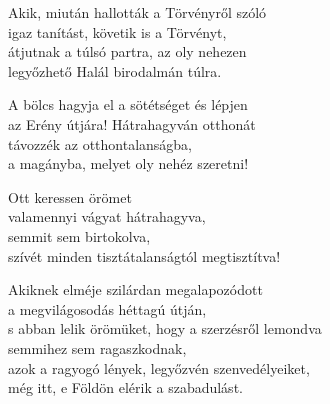 \begin{dhpverse}

 Akik, miután hallották a Törvényről szóló\\
igaz tanítást, követik is a Törvényt,\\
átjutnak a túlsó partra, az oly nehezen\\
legyőzhető Halál birodalmán túlra.

 A bölcs hagyja el a sötétséget és lépjen\\
az Erény útjára! Hátrahagyván otthonát\\
távozzék az otthontalanságba,\\
a magányba, melyet oly nehéz szeretni!

 Ott keressen örömet\\
valamennyi vágyat hátrahagyva,\\
semmit sem birtokolva,\\
szívét minden tisztátalanságtól megtisztítva!

 Akiknek elméje szilárdan megalapozódott\\
a megvilágosodás héttagú útján,\\
s abban lelik örömüket, hogy a szerzésről lemondva\\
semmihez sem ragaszkodnak,\\
azok a ragyogó lények, legyőzvén szenvedélyeiket,\\
még itt, e Földön elérik a szabadulást.

\end{dhpverse}

